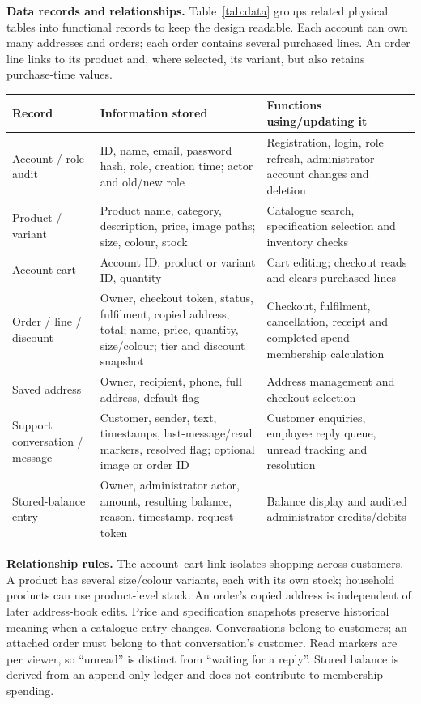 \newpage
\textbf{Data records and relationships.} Table~\ref{tab:data} groups related physical tables into functional records to keep the design readable. Each account can own many addresses and orders; each order contains several purchased lines. An order line links to its product and, where selected, its variant, but also retains purchase-time values.
\begin{center}
\small
\begin{tabularx}{\linewidth}{|p{27mm}|Y|Y|}\hline
\textbf{Record}&\textbf{Information stored}&\textbf{Functions using/updating it}\\\hline
Account / role audit&ID, name, email, password hash, role, creation time; actor and old/new role&Registration, login, role refresh, administrator account changes and deletion\\\hline
Product / variant&Product name, category, description, price, image paths; size, colour, stock&Catalogue search, specification selection and inventory checks\\\hline
Account cart&Account ID, product or variant ID, quantity&Cart editing; checkout reads and clears purchased lines\\\hline
Order / line / discount&Owner, checkout token, status, fulfilment, copied address, total; name, price, quantity, size/colour; tier and discount snapshot&Checkout, fulfilment, cancellation, receipt and completed-spend membership calculation\\\hline
Saved address&Owner, recipient, phone, full address, default flag&Address management and checkout selection\\\hline
Support conversation / message&Customer, sender, text, timestamps, last-message/read markers, resolved flag; optional image or order ID&Customer enquiries, employee reply queue, unread tracking and resolution\\\hline
Stored-balance entry&Owner, administrator actor, amount, resulting balance, reason, timestamp, request token&Balance display and audited administrator credits/debits\\\hline
\end{tabularx}
\label{tab:data}
\end{center}

\textbf{Relationship rules.} The account--cart link isolates shopping across customers. A product has several size/colour variants, each with its own stock; household products can use product-level stock. An order's copied address is independent of later address-book edits. Price and specification snapshots preserve historical meaning when a catalogue entry changes. Conversations belong to customers; an attached order must belong to that conversation's customer. Read markers are per viewer, so ``unread'' is distinct from ``waiting for a reply''. Stored balance is derived from an append-only ledger and does not contribute to membership spending.


